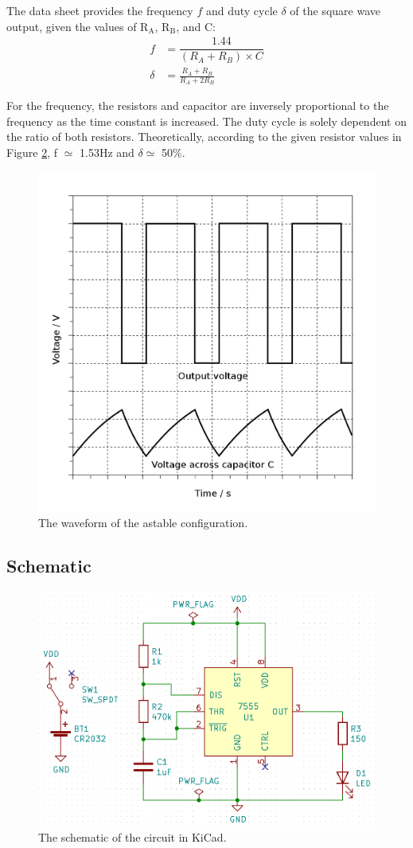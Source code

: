 \documentclass[10pt,twocolumn]{article}
\begin{document}
\noindent
The data sheet provides the frequency $f$ and duty cycle $\delta$ of the square wave output, given the values of ${\mbox{R}}_{\mbox{A}}$, ${\mbox{R}}_{\mbox{B}}$, and C:
\begin{align*}
f &= \dfrac{1.44}{(R_A+R_B)\times{C}}
\\
\delta &= \frac{R_{A}+R_{B}}{R_{A}+2R_{B}}
\end{align*}

\noindent
For the frequency, the resistors and capacitor are inversely proportional to the frequency as the time constant is increased. The duty cycle is solely dependent on the ratio of both resistors. Theoretically, according to the given resistor values in Figure \ref{fig4}, f $\simeq$ 1.53Hz and $\delta \simeq$ 50\%.

\begin{figure}[H]
	\centering
	\includegraphics[width=0.7\linewidth]{images/astable-waveform.png}
	\caption{The waveform of the astable configuration.}
	\label{fig3}
\end{figure}

\subsection{Schematic}

\begin{figure}[H]
	\centering
	\includegraphics[width=1\linewidth]{images/schematic.png}
	\caption{The schematic of the circuit in KiCad.}
	\label{fig4}
\end{figure}
\end{document}
